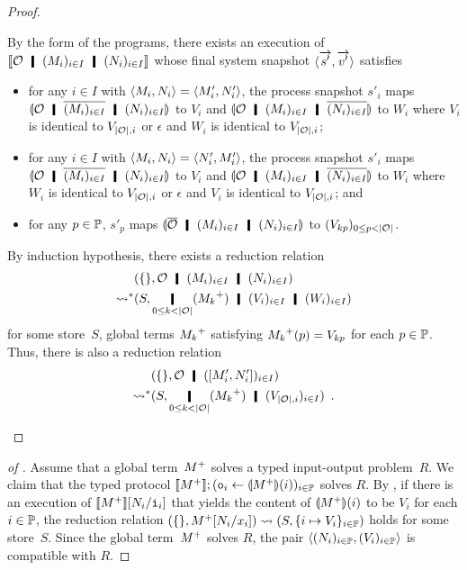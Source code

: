 \begin{proof}
\begin{description}
	  By the form of the programs, there exists an execution of
	  $\semo{\hypert\hmid (M_i)_{i\in I}\hmid (N_i)_{i\in I}}$
	  whose final system snapshot $\langle{\overrightarrow{s'}, \overrightarrow{v'}}\rangle$
	  satisfies
	  \begin{itemize}
	   \item for any $i\in I$ with $\langle{M_i,N_i}\rangle = \langle{M'_i,
		 N'_i}\rangle$, the process snapshot
		 $s'_i$ maps
		 $\semoi{\hypert\hmid \overline{(M_i)_{i\in I}}\hmid
		 (N_i)_{i\in I}}$ to $V_i$ and
		 $\semoi{\hypert\hmid (M_i)_{i\in I}\hmid
		 \overline{(N_i)_{i\in I}}}$ to $W_i$ where
		 $V_i$ is identical to $V_{|\mathcal{O}|,i}$ or
		 $\epsilon$ and $W_i$ is identical to
		 $V_{|\mathcal{O}|,i}$;
	   \item
		 for any $i\in I$ with $\langle{M_i,N_i}\rangle = \langle{N'_i,
		 M'_i}\rangle$, the process snapshot
		 $s'_i$ maps
		 $\semoi{\hypert\hmid \overline{(M_i)_{i\in I}}\hmid
		 (N_i)_{i\in I}}$ to $V_i$ and
		 $\semoi{\hypert\hmid (M_i)_{i\in I}\hmid
		 \overline{(N_i)_{i\in I}}}$ to $W_i$ where
		 $W_i$ is identical to $V_{|\mathcal{O}|,i}$ or
		 $\epsilon$ and $V_i$ is identical to
		 $V_{|\mathcal{O}|,i}$; and
	   \item for any $p\in\mathbb{P}$,
		 $s'_p$ maps $\semoi{\overline{\hypert}\hmid (M_i)_{i\in
		 I}\hmid (N_i)_{i\in I}}$ to
		 $(V_{kp})_{0\le p < |\mathcal{O}|}$.
	  \end{itemize}
	  By induction hypothesis, there exists a reduction relation
	  \begin{align*}
	   &\concreteconf{\{\}}{\hypert\hmid (M_i)_{i\in I}\hmid
	   (N_i)_{i\in I}}
	   \\
	   \reduction&\concreteconf{S}{\operatorname*{\hmid}_{0\le k <
	   |\hypert|}
	   (\m{M_k})\hmid (V_i)_{i\in I}\hmid (W_i)_{i\in I}}
	  \end{align*}
	  for some store~$S$, global terms ${M_k}^+$ satisfying
	  ${M_k}^+(p) = V_{kp}$ for each $p\in \mathbb{P}$.
	  Thus, there is also a reduction relation
	  \begin{align*}
	   &\concreteconf{\{\}}{\hypert\hmid (\cotuple{M'_i,N'_i})_{i\in
	   I}}
	   \\
	   \reduction&\concreteconf{S}{\operatorname*{\hmid}_{0\le k <
	   |\hypert|}(\m{M_k})\hmid (V_{|\hypert|,i})_{i\in I}}\enspace.
	  \end{align*}
    \end{description}
   \end{proof}

 \begin{proof}[of ]
  Assume that a global term~${M}^+$ solves a typed input-output problem~$R$.
  We claim that the typed protocol
  $\llbracket{{M}^+}\rrbracket; (\texttt{o}_i\leftarrow \llparenthesis{{M}^+}\rrparenthesis(i))_{i\in \mathbb{P}}$
  solves $R$.
  By ,
  if there is an execution of $\llbracket{{M}^+}\rrbracket[N_i / \texttt{i}_i]$ that yields
  the content of $\llparenthesis{{M}^+}\rrparenthesis(i)$ to be $V_i$ for each $i\in
  \mathbb{P}$,
  the reduction relation $({\{\}},{{M}^+[N_i/x_i]})\rightsquigarrow
  ({S},{\{i\mapsto V_i\}_{i\in \mathbb{P}}})$ holds for some
  store~$S$.
  Since the global term~${M}^+$ solves $R$, the pair
  $\langle{(N_i)_{i\in \mathbb{P}}, (V_i)_{i\in\mathbb{P}}}\rangle$ is compatible
  with $R$.
 \end{proof}

